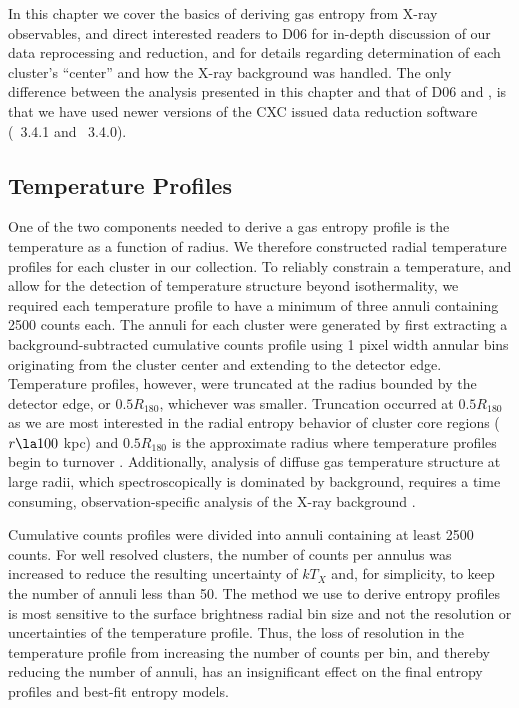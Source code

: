 In this chapter we cover the basics of deriving gas entropy from X-ray
observables, and direct interested readers to D06 for in-depth
discussion of our data reprocessing and reduction, and
\citet{xrayband} for details regarding determination of each cluster's
``center'' and how the X-ray background was handled. The only
difference between the analysis presented in this chapter and that of
D06 and \citet{xrayband}, is that we have used newer versions of the
CXC issued data reduction software (\ciao\ 3.4.1 and \caldb\ 3.4.0).

\subsection{Temperature Profiles}
\label{sec:entsupptemppr}

One of the two components needed to derive a gas entropy profile is
the temperature as a function of radius. We therefore constructed
radial temperature profiles for each cluster in our collection. To
reliably constrain a temperature, and allow for the detection of
temperature structure beyond isothermality, we required each
temperature profile to have a minimum of three annuli containing 2500
counts each. The annuli for each cluster were generated by first
extracting a background-subtracted cumulative counts profile using 1
pixel width annular bins originating from the cluster center and
extending to the detector edge. Temperature profiles, however, were
truncated at the radius bounded by the detector edge, or $0.5
R_{180}$, whichever was smaller. Truncation occurred at $0.5 R_{180}$
as we are most interested in the radial entropy behavior of cluster
core regions ($r \la 100$ kpc) and $0.5 R_{180}$ is the approximate
radius where temperature profiles begin to turnover
\citep{2005ApJ...628..655V}.  Additionally, analysis of diffuse gas
temperature structure at large radii, which spectroscopically is
dominated by background, requires a time consuming,
observation-specific analysis of the X-ray background \cite[see][for a
  detailed discussion on this point]{minggroups}.

Cumulative counts profiles were divided into annuli containing at
least 2500 counts. For well resolved clusters, the number of counts
per annulus was increased to reduce the resulting uncertainty of
$kT_X$ and, for simplicity, to keep the number of annuli less than
50. The method we use to derive entropy profiles is most sensitive to
the surface brightness radial bin size and not the resolution or
uncertainties of the temperature profile. Thus, the loss of resolution
in the temperature profile from increasing the number of counts per
bin, and thereby reducing the number of annuli, has an insignificant
effect on the final entropy profiles and best-fit entropy models.

